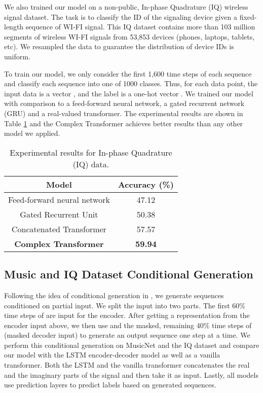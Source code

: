 \documentclass{article}
\begin{document}
We also trained our model on a non-public, In-phase Quadrature (IQ) wireless signal dataset. The task is to classify the ID of the signaling device given a fixed-length sequence of WI-FI signal. This IQ dataset contains more than 103 million segments of wireless WI-FI signals from 53,853 devices (phones, laptops, tablets, etc). We resampled the data to guarantee the distribution of device IDs is uniform.

To train our model, we only consider the first 1,600 time steps of each sequence and classify each sequence into one of 1000 classes. Thus, for each data point, the input data is a vector , and the label is a one-hot vector . We trained our model with comparison to a feed-forward neural network, a gated recurrent network (GRU) \cite{cho2014learning} and a real-valued transformer. The experimental results are shown in Table \ref{tab:result_iq} and the Complex Transformer achieves better results than any other model we applied.

\begin{table}
\centering
\caption{Experimental results for In-phase Quadrature (IQ) data.}
\begin{tabular}{c c}
    \toprule
    Model & Accuracy (\%)  \\
    \midrule
    Feed-forward neural network & 47.12 \\
    Gated Recurrent Unit & 50.38 \\
    Concatenated Transformer & 57.57 \\
    \textbf{Complex Transformer} & \textbf{59.94} \\
    \bottomrule
\end{tabular}
\label{tab:result_iq}
\end{table}

\subsection{Music and IQ Dataset Conditional Generation}



Following the idea of conditional generation in \cite{huang2018music}, we generate sequences conditioned on partial input. We split the input  into two parts. The first 60\% time steps of  are input for the encoder. After getting a representation  from the encoder input above, we then use  and the masked, remaining 40\% time steps of  (masked decoder input) to generate an output sequence one step at a time. We perform this conditional generation on MusicNet and the IQ dataset and compare our model with the LSTM encoder-decoder model \cite{hochreiter1997long} as well as a vanilla transformer. Both the LSTM and the vanilla transformer concatenates the real and the imaginary parts of the signal and then take it as input. Lastly, all models use prediction layers to predict labels based on generated sequences. 
\end{document}
